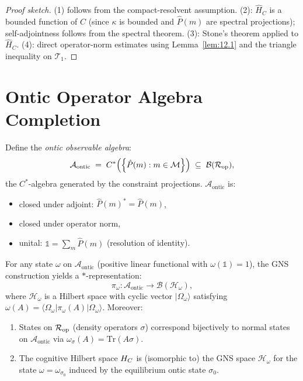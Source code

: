 \begin{proof}[Proof sketch]
(1) follows from the compact-resolvent assumption.
(2): $\hat{H}_C$ is a bounded function of $\hat{C}$ (since $\kappa$ is
bounded and $\hat{P}(m)$ are spectral projections); self-adjointness
follows from the spectral theorem.
(3): Stone's theorem applied to $\hat{H}_C$.
(4): direct operator-norm estimates using Lemma~\ref{lem:12.1} and
the triangle inequality on $\mathcal{T}_1$.
\end{proof}

\section{Ontic Operator Algebra Completion}
\label{sec:algebra}

\begin{definition}\label{def:12.7}
Define the \emph{ontic observable algebra}:
\[
  \mathcal{A}_{\mathrm{ontic}} \;=\;
  C^*\!\left(\left\{\hat{P}(m) : m \in \mathcal{M}\right\}\right)
  \;\subseteq\; \mathcal{B}(\mathcal{R}_{\mathrm{op}}),
\]
the $C^*$-algebra generated by the constraint projections.
$\mathcal{A}_{\mathrm{ontic}}$ is:
\begin{itemize}
  \item closed under adjoint: $\hat{P}(m)^* = \hat{P}(m)$,
  \item closed under operator norm,
  \item unital: $\mathbb{1} = \sum_m \hat{P}(m)$ (resolution of identity).
\end{itemize}
\end{definition}

\begin{theorem}\label{thm:12.4}
For any state $\omega$ on $\mathcal{A}_{\mathrm{ontic}}$ (positive linear
functional with $\omega(\mathbb{1}) = 1$), the GNS construction yields
a $*$-representation:
\[
  \pi_\omega : \mathcal{A}_{\mathrm{ontic}} \to \mathcal{B}(\mathcal{H}_\omega),
\]
where $\mathcal{H}_\omega$ is a Hilbert space with cyclic vector
$|\Omega_\omega\rangle$ satisfying
$\omega(A) = \langle\Omega_\omega|\pi_\omega(A)|\Omega_\omega\rangle$.
Moreover:
\begin{enumerate}
  \item States on $\mathcal{R}_{\mathrm{op}}$ (density operators $\sigma$) correspond
    bijectively to normal states on $\mathcal{A}_{\mathrm{ontic}}$ via
    $\omega_\sigma(A) = \mathrm{Tr}(A\sigma)$.
  \item The cognitive Hilbert space $H_C$ is (isomorphic to) the GNS space
    $\mathcal{H}_\omega$ for the state $\omega = \omega_{\sigma_0}$ induced
    by the equilibrium ontic state $\sigma_0$.
\end{enumerate}
\end{theorem}

